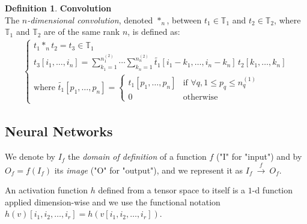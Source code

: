 \documentclass{article}
\theoremstyle{definition}
\newtheorem{definition}{Definition}[section]
\newcommand{\tspace}{\mathbb{T}}
\begin{document}
\begin{definition}\textbf{Convolution}\\
The \emph{$n$-dimensional convolution}, denoted $\ast_n$, between $t_1 \in \tspace_1$ and $t_2 \in \tspace_2$, where $\tspace_1$ and $\tspace_2$ are of the same rank $n$, is defined as:
\begin{gather*}
\left\{
  \begin{array}{l}
    t_1 \ast_n t_2 = t_3 \in \tspace_1 \\
    t_3[i_1, \ldots, i_n] =
    \displaystyle \sum_{k_1=1}^{n_1^{(2)}} \cdots \sum_{k_n=1}^{n_n^{(2)}}
    \widetilde{t_1}[i_1 - k_1, \ldots, i_n - k_n] \hspace{2pt} t_2[k_1, \ldots, k_n] \\
    \text{where } \widetilde{t_1}[p_1, \ldots, p_n] =
    \begin{cases}
      t_1[p_1, \ldots, p_n] & \text{if } \forall q, 1 \le p_q \le n_q^{(1)} \\
      0 & \text{otherwise}
    \end{cases}
  \end{array}
\right.
\end{gather*}
\end{definition}

\subsection{Neural Networks}

We denote by $I_f$ the \textit{domain of definition} of a function $f$ ("I" for "input") and by $O_f = f(I_f)$ its \textit{image} ("O" for "output"), and we represent it as $I_f~\xrightarrow{f}~O_f$.

An activation function $h$ defined from a tensor space to itself is a $1$-d function applied dimension-wise and we use the functional notation $h(v)[i_1, i_2, \ldots, i_r] = h(v[i_1, i_2, \ldots, i_r])$.
\end{document}
